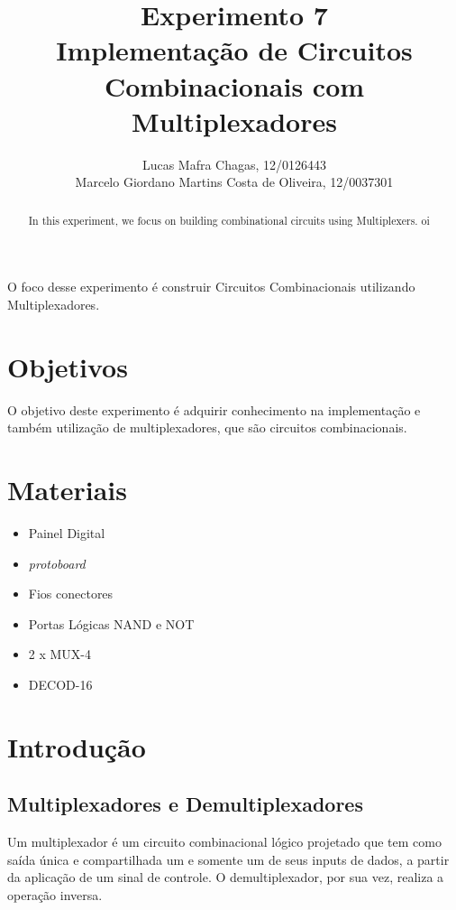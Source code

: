 \documentclass[12pt]{article}
\title{Experimento 7\\ 
	Implementação de Circuitos Combinacionais com Multiplexadores}
\author{
	Lucas Mafra Chagas, 12/0126443 \\
	Marcelo Giordano Martins Costa de Oliveira,  12/0037301
}
\begin{document}
 

\maketitle

 \begin{abstract}
	 In this experiment, we focus on building combinational circuits using Multiplexers. oi
 \end{abstract}  
 \begin{resumo} 
	O foco desse experimento é construir Circuitos Combinacionais utilizando Multiplexadores.
 \end{resumo}
\section{Objetivos}
\label{sec:Objetivos}

O objetivo deste experimento é adquirir conhecimento na implementação e também utilização de multiplexadores, que são circuitos combinacionais.

\section{Materiais} 
\label{sec:Materiais}

\begin{itemize}						 							
    \item Painel Digital
 
    \item \textit{protoboard}
    
    \item Fios conectores
    
    \item Portas Lógicas NAND e NOT
    
	\item 2 x MUX-4
	
	\item DECOD-16
    
\end{itemize}


\section{Introdução}
\label{sec:Introducao}
\subsection{Multiplexadores e Demultiplexadores}
Um multiplexador é um circuito combinacional lógico projetado que tem como saída única e compartilhada um e somente um de seus inputs de dados, a partir da aplicação de um sinal de controle. O demultiplexador, por sua vez, realiza a operação inversa.
\end{document}
